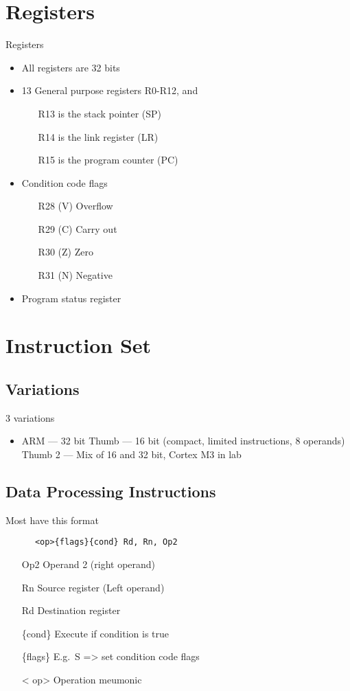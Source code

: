 \documentclass[12pt]{report}
\begin{document}
  \section{Registers}
    Registers\:
    \begin{itemize}
      \item All registers are 32 bits
      \item 13 General purpose registers\: R0-R12, and
        \begin{itemize}
          \item[R13] is the stack pointer (SP)
          \item[R14] is the link register (LR)
          \item[R15] is the program counter (PC)
        \end{itemize}
      \item Condition code flags\:
        \begin{itemize}
        \item[R28 (V)] Overflow
        \item[R29 (C)] Carry out
        \item[R30 (Z)] Zero
        \item[R31 (N)] Negative
        \end{itemize}
      \item Program status register
    \end{itemize}

  \section{Instruction Set}
    \subsection{Variations}
    3 variations
    \begin{itemize}
      \item ARM --- 32 bit
        Thumb --- 16 bit (compact, limited instructions, 8 operands)
        Thumb 2 --- Mix of 16 and 32 bit, Cortex M3 in lab
    \end{itemize}

    \subsection{Data Processing Instructions}
    Most have this format\\
    \begin{lstlisting}
      <op>{flags}{cond} Rd, Rn, Op2
    \end{lstlisting}
    \begin{itemize}
      \item[Op2] Operand 2 (right operand)
      \item[Rn] Source register (Left operand)
      \item[Rd] Destination register
      \item[\{cond\}] Execute if condition is true
      \item[\{flags\}] E.g.\ S =\textgreater{} set condition code flags
      \item[\textless{} op\textgreater] Operation meumonic
    \end{itemize}
\end{document}
